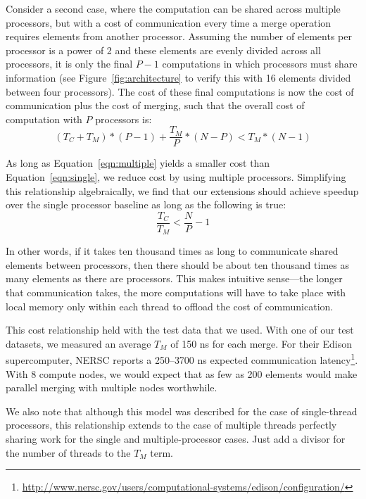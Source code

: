 \documentclass[10pt]{article}
\begin{document}
Consider a second case, where the computation can be shared across multiple processors, but with
a cost of communication every time a merge operation requires elements from another processor.
Assuming the number of elements per processor is a power of 2 and these elements are evenly 
divided across all processors, it is only the final $P - 1$ computations in which processors
must share information (see Figure~\ref{fig:architecture} to verify this with 16 elements
divided between four processors).
The cost of these final computations is now the cost of communication plus the cost of merging,
such that the overall cost of computation with $P$ processors is:
\begin{equation}\label{eqn:multiple}
\left( T_C + T_M \right) *(P-1)+\frac{T_M}{P}*(N-P)<T_M*(N-1)
\end{equation}

As long as Equation~\ref{eqn:multiple} yields a smaller cost than Equation~\ref{eqn:single}, we
reduce cost by using multiple processors.
Simplifying this relationship algebraically, we find that our extensions should achieve speedup
over the single processor baseline as long as the following is true:
\begin{equation}
\frac{T_C}{T_M} < \frac{N}{P} - 1
\end{equation}

In other words, if it takes ten thousand times as long to communicate shared elements between
processors, then there should be about ten thousand times as many elements as there are
processors.
This makes intuitive sense---the longer that communication takes, the more computations will
have to take place with local memory only within each thread to offload the cost of communication.

This cost relationship held with the test data that we used.
With one of our test datasets, we measured an average $T_M$ of 150 ns for each merge.
For their Edison supercomputer, NERSC reports a 250--3700 ns expected communication 
latency\footnote{\url{http://www.nersc.gov/users/computational-systems/edison/configuration/}}.
With 8 compute nodes, we would expect that as few as 200 elements would make parallel merging
with multiple nodes worthwhile.

We also note that although this model was described for the case of single-thread processors,
this relationship extends to the case of multiple threads perfectly sharing work for the single and
multiple-processor cases.
Just add a divisor for the number of threads to the $T_M$ term.
\end{document}
